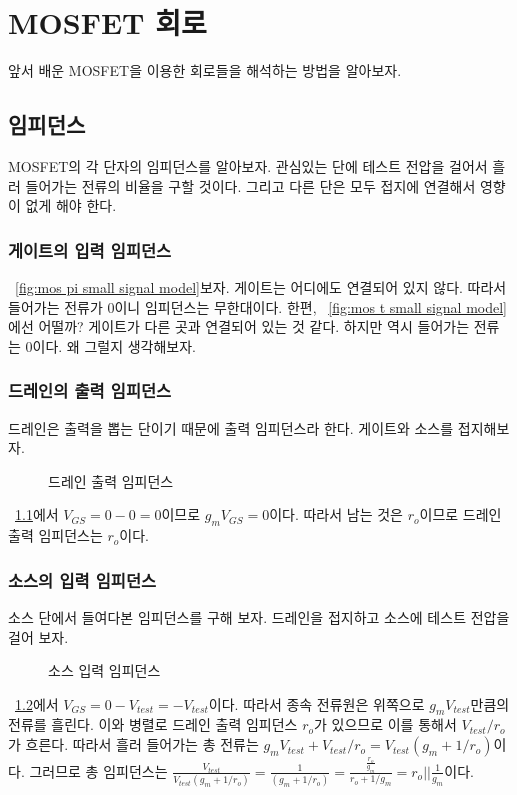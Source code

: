 \chapter{MOSFET 회로}
앞서 배운 MOSFET을 이용한 회로들을 해석하는 방법을 알아보자.

\section{임피던스}
MOSFET의 각 단자의 임피던스를 알아보자. 관심있는 단에 테스트 전압을 걸어서 흘러 들어가는 전류의 비율을 구할 것이다. 그리고 다른 단은 모두 접지에 연결해서 영향이 없게 해야 한다.
\subsection{게이트의 입력 임피던스}
\figurename~\ref{fig:mos pi small signal model}\을 보자. 게이트는 어디에도 연결되어 있지 않다. 따라서 들어가는 전류가 0이니 임피던스는 무한대이다.
한편, \figurename~\ref{fig:mos t small signal model}에선 어떨까? 게이트가 다른 곳과 연결되어 있는 것 같다. 하지만 역시 들어가는 전류는 0이다. 왜 그럴지 생각해보자.
\subsection{드레인의 출력 임피던스}
드레인은 출력을 뽑는 단이기 때문에 출력 임피던스라 한다. 게이트와 소스를 접지해보자.
\begin{figure}[!tpb]
    \centering
    \caption{드레인 출력 임피던스}\label{fig:drain output impedance}
\end{figure}
\figurename~\ref{fig:drain output impedance}에서 $V_{GS}=0-0=0$이므로 $g_mV_{GS}=0$이다. 따라서 남는 것은 $r_o$이므로 드레인 출력 임피던스는 $r_o$이다.
\subsection{소스의 입력 임피던스}
소스 단에서 들여다본 임피던스를 구해 보자. 드레인을 접지하고 소스에 테스트 전압을 걸어 보자.
\begin{figure}[!hpb]
    \centering
    \caption{소스 입력 임피던스}\label{fig:src input impedance}
\end{figure}
\figurename~\ref{fig:src input impedance}에서 $V_{GS}=0-V_{test}=-V_{test}$이다. 따라서 종속 전류원은 위쪽으로 $g_mV_{test}$만큼의 전류를 흘린다.
이와 병렬로 드레인 출력 임피던스 $r_o$가 있으므로 이를 통해서 $V_{test}/r_o$가 흐른다.
따라서 흘러 들어가는 총 전류는 $g_mV_{test}+V_{test}/r_o=V_{test}(g_m+1/r_o)$이다.
그러므로 총 임피던스는 $\frac{V_{test}}{V_{test}(g_m+1/r_o)}=\frac{1}{(g_m+1/r_o)}=\frac{\frac{r_o}{g_m}}{r_o+1/g_m}=\left. r_o\left.\right\vert\right\vert\frac{1}{g_m}$이다.

